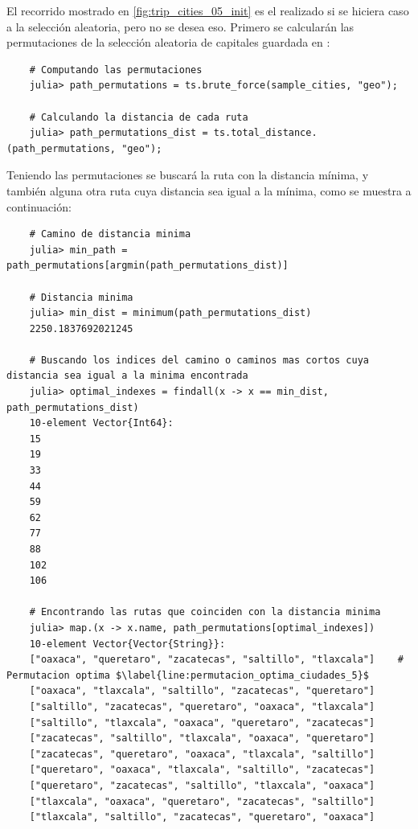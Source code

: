 El recorrido mostrado en \cref{fig:trip_cities_05_init} es el realizado si se hiciera caso a la selección aleatoria, pero no se desea eso. Primero se calcularán las permutaciones de la selección aleatoria de capitales guardada en :
\begin{verbatim}
    # Computando las permutaciones
    julia> path_permutations = ts.brute_force(sample_cities, "geo");

    # Calculando la distancia de cada ruta
    julia> path_permutations_dist = ts.total_distance.(path_permutations, "geo");
\end{verbatim}

Teniendo las permutaciones se buscará la ruta con la distancia mínima, y también alguna otra ruta cuya distancia sea igual a la mínima, como se muestra a continuación:
\begin{verbatim}
    # Camino de distancia minima
    julia> min_path = path_permutations[argmin(path_permutations_dist)]

    # Distancia minima
    julia> min_dist = minimum(path_permutations_dist)
    2250.1837692021245

    # Buscando los indices del camino o caminos mas cortos cuya distancia sea igual a la minima encontrada
    julia> optimal_indexes = findall(x -> x == min_dist, path_permutations_dist)
    10-element Vector{Int64}:
    15
    19
    33
    44
    59
    62
    77
    88
    102
    106

    # Encontrando las rutas que coinciden con la distancia minima
    julia> map.(x -> x.name, path_permutations[optimal_indexes])
    10-element Vector{Vector{String}}:
    ["oaxaca", "queretaro", "zacatecas", "saltillo", "tlaxcala"]    # Permutacion optima $\label{line:permutacion_optima_ciudades_5}$
    ["oaxaca", "tlaxcala", "saltillo", "zacatecas", "queretaro"]
    ["saltillo", "zacatecas", "queretaro", "oaxaca", "tlaxcala"]
    ["saltillo", "tlaxcala", "oaxaca", "queretaro", "zacatecas"]
    ["zacatecas", "saltillo", "tlaxcala", "oaxaca", "queretaro"]
    ["zacatecas", "queretaro", "oaxaca", "tlaxcala", "saltillo"]
    ["queretaro", "oaxaca", "tlaxcala", "saltillo", "zacatecas"]
    ["queretaro", "zacatecas", "saltillo", "tlaxcala", "oaxaca"]
    ["tlaxcala", "oaxaca", "queretaro", "zacatecas", "saltillo"]
    ["tlaxcala", "saltillo", "zacatecas", "queretaro", "oaxaca"]
\end{verbatim}

